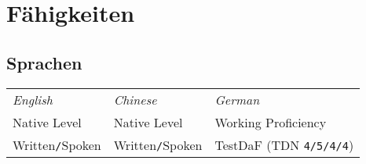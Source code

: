 \section{\textcolor{section_4}{Fähigkeiten}}
\vspace{-\parskip}
	\subsection*{Sprachen}
		\begin{center}
			\begin{tabular}{@{} p{4cm} p{4cm} p{4.1cm} @{}}
				\textcolor{subheader}{\textit{English}} & \textcolor{subheader}{\textit{Chinese}} & \textcolor{subheader}{\textit{German}} \\
				Native Level & Native Level & Working Proficiency \\ 
				\textcolor{subtitles}{Written\texttt{/}Spoken} & \textcolor{subtitles}{Written\texttt{/}Spoken} & TestDaF (TDN \texttt{4/5/4/4})
			\end{tabular}
		\end{center}
	\vspace{-\parskip}
